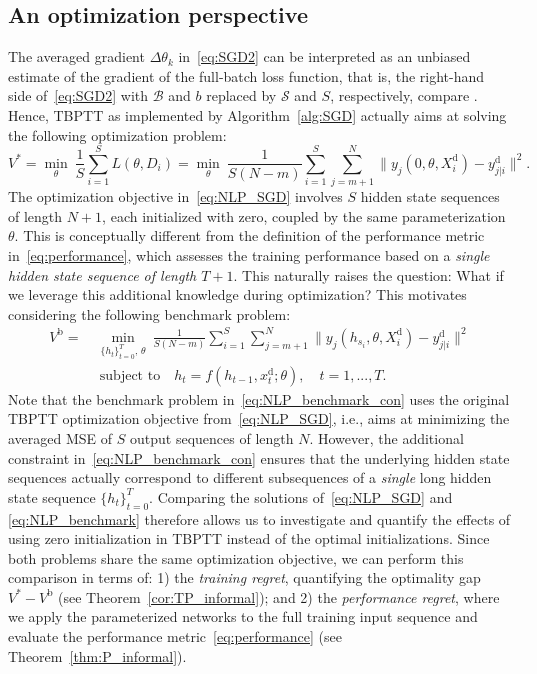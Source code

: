 \documentclass{article} %
\begin{document}
\subsection{An optimization perspective}\label{sec:optimization}

The averaged gradient $\Delta\theta_k$ in~\eqref{eq:SGD2} can be interpreted as an unbiased estimate of the gradient of the full-batch loss function, that is, the right-hand side of~\eqref{eq:SGD2} with $\mathcal{B}$ and $b$ replaced by $\mathcal{S}$ and $S$, respectively, compare \citet{Tian2023}. Hence, TBPTT as implemented by Algorithm~\ref{alg:SGD} actually aims at solving the following optimization problem:
\begin{equation}\label{eq:NLP_SGD}
	V^*
	= \min\limits_{\theta}\ \frac{1}{S}\sum_{i=1}^{S} L(\theta,D_i)
	= \min\limits_{\theta}\ \frac{1}{S(N-m)}\sum_{i=1}^{S}\sum_{j=m+1}^{N} \|{y}_j(0,\theta,X_i^\mathrm{d})-y_{j|i}^\mathrm{d}\|^2.
\end{equation}
The optimization objective in~\eqref{eq:NLP_SGD} involves $S$ hidden state sequences of length $N+1$, each initialized with zero, coupled by the same parameterization $\theta$.
This is conceptually different from the definition of the performance metric in~\eqref{eq:performance}, which assesses the training performance based on a \emph{single hidden state sequence of length $T+1$}.
This naturally raises the question: What if we leverage this additional knowledge during optimization?
This motivates considering the following benchmark problem:
\begin{subequations}\label{eq:NLP_benchmark}
	\begin{align}
			V^\mathrm{b} = &\ \min\limits_{\{h_t\}_{t=0}^T,\, \theta}\ \frac{1}{S(N-m)}\sum_{i=1}^{S}\sum_{j=m+1}^{N} \|{y}_j(h_{s_i},\theta,X_i^\mathrm{d})-y_{j|i}^\mathrm{d}\|^2 \label{eq:NLP_benchmark_obj}\\
		&\ \ \text{subject to} \quad  h_{t} = f(h_{t-1},x^\mathrm{d}_{t};\theta), \quad t=1,...,T. \label{eq:NLP_benchmark_con}
	\end{align}
\end{subequations}
Note that the benchmark problem in~\eqref{eq:NLP_benchmark_con} uses the original TBPTT optimization objective from~\eqref{eq:NLP_SGD}, i.e., aims at minimizing the averaged MSE of $S$ output sequences of length $N$. However, the additional constraint in~\eqref{eq:NLP_benchmark_con} ensures that the underlying hidden state sequences actually correspond to different subsequences of a \emph{single} long hidden state sequence $\{h_t\}_{t=0}^T$.
Comparing the solutions of~\eqref{eq:NLP_SGD} and \eqref{eq:NLP_benchmark} therefore allows us to investigate and quantify the effects of using zero initialization in TBPTT instead of the optimal initializations.
Since both problems share the same optimization objective, we can perform this comparison in terms of: 1) the \emph{training regret}, quantifying the optimality gap $V^*-V^\mathrm{b}$ (see Theorem~\ref{cor:TP_informal}); and 2) the \emph{performance regret}, where we apply the parameterized networks to the full training input sequence and evaluate the performance metric~\eqref{eq:performance} (see Theorem~\ref{thm:P_informal}).
\end{document}
